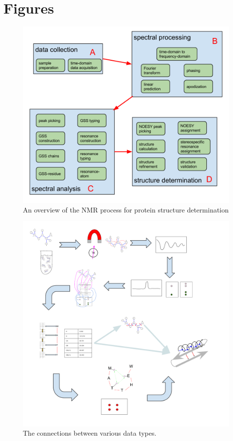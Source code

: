 \clearpage
\section{Figures}

\begin{figure}[h]
  \includegraphics[scale=0.42]{figures/nmr_overview}
  \caption{An overview of the NMR process for protein structure determination}
  \label{nmr_overview}
\end{figure}

\begin{figure}
  \includegraphics[scale=0.35]{figures/process_timeline}
  \caption{The connections between various data types.}
  \label{process_timeline}
\end{figure}


